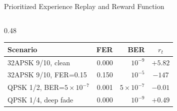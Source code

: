 \documentclass[aspectratio=169,10pt]{beamer}
\begin{document}
\begin{frame}[fragile,shrink=15]{Prioritized Experience Replay and Reward Function}
\begin{columns}[T]
\begin{column}{0.48\textwidth}
      {\scriptsize
      \begin{tabular}{p{2.6cm}rrc}
        \toprule
        \textbf{Scenario} & \textbf{FER} & \textbf{BER} & \textbf{$r_t$}\\
        \midrule
        32APSK 9/10, clean & 0.000 & $10^{-9}$ & $+5.82$\\
        32APSK 9/10, FER=0.15 & 0.150 & $10^{-5}$ & $-147$\\
        QPSK 1/2, BER=$5\times10^{-7}$ & 0.001 & $5\times10^{-7}$ & $-0.01$\\
        QPSK 1/4, deep fade & 0.000 & $10^{-9}$ & $+0.49$\\
        \bottomrule
      \end{tabular}}
    \end{column}
  \end{columns}
\end{frame}
\end{document}
